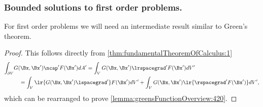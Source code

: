 \subsubsection{Bounded solutions to first order problems.}

For first order problems we will need an intermediate result similar to Green's theorem.

\begin{proof}
This follows directly from \cref{thm:fundamentalTheoremOfCalculus:1}
\begin{equation}\label{eqn:greensFunctionSolutions:440}
\begin{aligned}
   \int_{\partial V} &G(\Bx, \Bx') \ncap' F(\Bx') dA'
= \int_V G(\Bx, \Bx') \lrspacegrad' F(\Bx') dV' \\
&\quad = \int_V \lr{ G(\Bx, \Bx') \lspacegrad' } F(\Bx') dV' + \int_V G(\Bx, \Bx') \lr{ \rspacegrad' F(\Bx') } dV',
\end{aligned}
\end{equation}
which can be rearranged to prove \cref{lemma:greensFunctionOverview:420}.
\end{proof}
